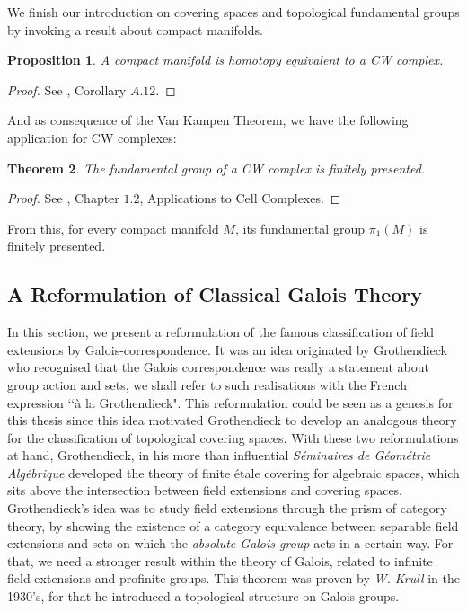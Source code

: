 \documentclass{article}
\theoremstyle{plain}
\newtheorem{theorem}{Theorem}[subsection]
\newtheorem{proposition}[theorem]{Proposition}
\theoremstyle{definition}
\begin{document}
\noindent We finish our introduction on covering spaces and topological fundamental groups by invoking a result about compact manifolds.
\begin{proposition}
    A compact manifold is homotopy equivalent to a CW complex.
\end{proposition}
\begin{proof}
    See \cite{Hatcher}, Corollary $A.12$.
\end{proof}

\noindent And as consequence of the Van Kampen Theorem, we have the following application for CW complexes:

\begin{theorem}
    The fundamental group of a CW complex is finitely presented.
\end{theorem}
\begin{proof}
    See \cite{Hatcher}, Chapter $1.2$, Applications to Cell Complexes.
\end{proof}

\noindent From this, for every compact manifold $M$, its fundamental group $\pi_1(M)$ is finitely presented.\\









\subsection{A Reformulation of Classical Galois Theory}

In this section, we present a reformulation of the famous classification of field extensions by Galois-correspondence. 
It was an idea originated by Grothendieck who recognised that the Galois correspondence was really a statement about group action and sets, 
we shall refer to such realisations with the French expression ‘‘\`a la Grothendieck". 
This reformulation could be seen as a genesis for this thesis since this idea motivated Grothendieck to develop an analogous theory for the classification of topological covering spaces.
With these two reformulations at hand, Grothendieck, in his more than influential \textit{S\'eminaires de G\'eom\'etrie Alg\'ebrique} \cite{SGA} developed the theory of finite \'etale covering for algebraic spaces, which sits above the intersection between field extensions and covering spaces.\\
Grothendieck's idea was to study field extensions through the prism of category theory, by showing the existence of a category equivalence between separable field extensions and sets on which the \textit{absolute Galois group} acts in a certain way.
For that, we need a stronger result within the theory of Galois, related to infinite field extensions and profinite groups. This theorem was proven by \textit{W. Krull} in the 1930's, for that he introduced a topological structure on Galois groups.\\
\end{document}

